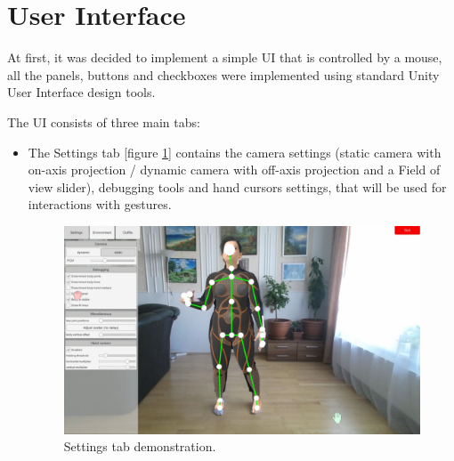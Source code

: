 \documentclass[a4paper]{report}
\begin{document}
\section{User Interface}
\label{section_ui}

\qquad At first, it was decided to implement a simple UI that is controlled by a mouse, all the panels, buttons and checkboxes were implemented using standard Unity User Interface design tools.  


The UI consists of three main tabs:

\begin{itemize}
    \item The Settings tab [figure \ref{fig:ui_1}] contains the camera settings (static camera with on-axis projection / dynamic camera with off-axis projection and a Field of view slider), debugging tools and hand cursors settings, that will be used for interactions with gestures.
    \begin{figure}[H]
    \centering
    \includegraphics[width=\textwidth, keepaspectratio]{images/UI/UI_1.png}
    \caption{Settings tab demonstration.}
    \label{fig:ui_1}
    \end{figure}
    

\end{itemize}
\end{document}
